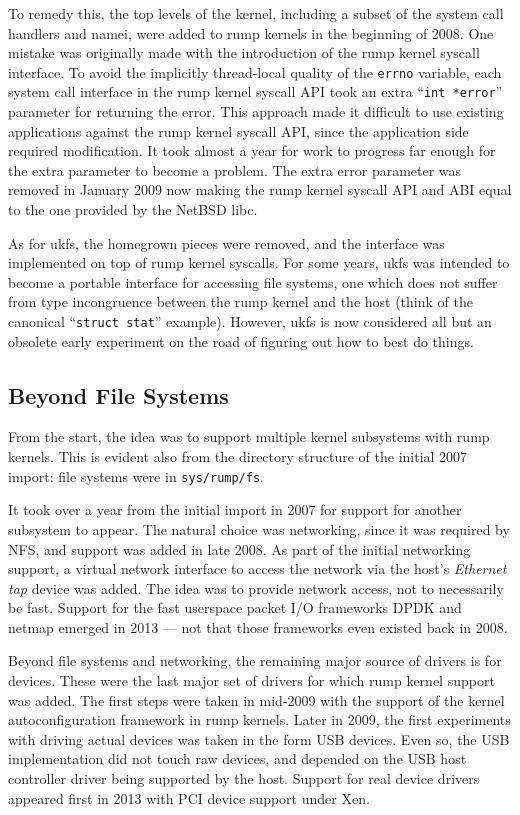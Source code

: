 To remedy this, the top levels of the kernel, including a subset of
the system call handlers and namei, were added to rump kernels in
the beginning of 2008.  One mistake was originally made with the
introduction of the rump kernel syscall interface.  To avoid the
implicitly thread-local quality of the \texttt{errno} variable, each
system call interface in the rump kernel syscall API took an extra
``\verb+int *error+'' parameter for returning the error.  This approach
made it difficult to use existing applications against the rump
kernel syscall API, since the application side required modification.
It took almost a year for work to progress far enough for the extra
parameter to become a problem.  The extra error parameter was removed
in January 2009 now making the rump kernel syscall API and ABI equal to
the one provided by the NetBSD libc.

As for ukfs, the homegrown pieces were removed, and the interface was
implemented on top of rump kernel syscalls.  For some years, ukfs was
intended to become a portable interface for accessing file systems,
\ie one which does not suffer from type incongruence between the rump
kernel and the host (think of the canonical ``\verb+struct stat+''
example).  However, ukfs is now considered all but an obsolete
early experiment on the road of figuring out how to best do things.


\subsection{Beyond File Systems}

From the start, the idea was to support multiple kernel subsystems with
rump kernels.  This is evident also from the directory structure of the
initial 2007 import: file systems were in \texttt{sys/rump/fs}.

It took over a year from the initial import in 2007 for support for
another subsystem to appear.  The natural choice was networking, since
it was required by NFS, and support was added in late 2008.  As part of
the initial networking support, a virtual network interface to access
the network via the host's \textit{Ethernet tap} device was added.
The idea was to provide network access, not to necessarily be fast.
Support for the fast userspace packet I/O frameworks DPDK and
netmap emerged in 2013 --- not that those frameworks even existed back
in 2008.

Beyond file systems and networking, the remaining major source of
drivers is for devices.  These were the last major set of drivers
for which rump kernel support was added.  The first steps were taken
in mid-2009 with the support of the kernel autoconfiguration framework
in rump kernels.  Later in 2009, the first experiments with driving
actual devices was taken in the form USB devices.  Even so, the USB
implementation did not touch raw devices, and depended on the USB host
controller driver being supported by the host.  Support for real device
drivers appeared first in 2013 with PCI device support under Xen.


